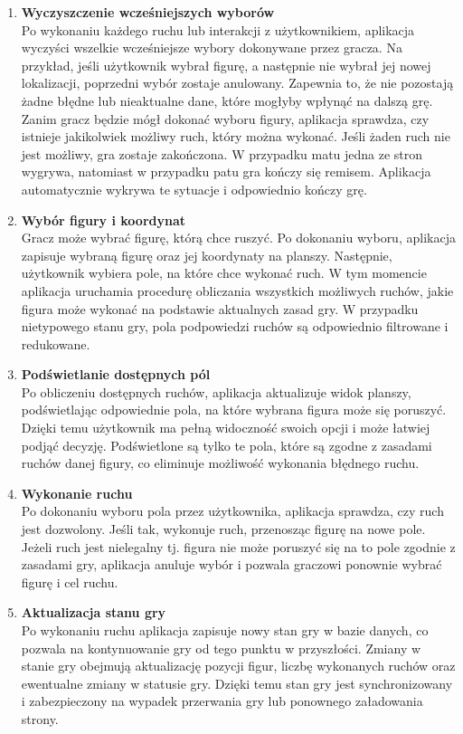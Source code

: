 \documentclass[12pt,a4paper]{article}
\begin{document}
\begin{enumerate}
    \item \textbf{Wyczyszczenie wcześniejszych wyborów}\\
    Po wykonaniu każdego ruchu lub interakcji z użytkownikiem, aplikacja wyczyści wszelkie wcześniejsze wybory dokonywane przez gracza. Na przykład, jeśli użytkownik wybrał figurę, a następnie nie wybrał jej nowej lokalizacji, poprzedni wybór zostaje anulowany. Zapewnia to, że nie pozostają żadne błędne lub nieaktualne dane, które mogłyby wpłynąć na dalszą grę. Zanim gracz będzie mógł dokonać wyboru figury, aplikacja sprawdza, czy istnieje jakikolwiek możliwy ruch, który można wykonać. Jeśli żaden ruch nie jest możliwy, gra zostaje zakończona. W przypadku matu jedna ze stron wygrywa, natomiast w przypadku patu gra kończy się remisem. Aplikacja automatycznie wykrywa te sytuacje i odpowiednio kończy grę.

    \item \textbf{Wybór figury i koordynat}\\
    Gracz może wybrać figurę, którą chce ruszyć. Po dokonaniu wyboru, aplikacja zapisuje wybraną figurę oraz jej koordynaty na planszy. Następnie, użytkownik wybiera pole, na które chce wykonać ruch. W tym momencie aplikacja uruchamia procedurę obliczania wszystkich możliwych ruchów, jakie figura może wykonać na podstawie aktualnych zasad gry. W przypadku nietypowego stanu gry,  pola podpowiedzi ruchów są odpowiednio filtrowane i redukowane.

    \item \textbf{Podświetlanie dostępnych pól}\\
    Po obliczeniu dostępnych ruchów, aplikacja aktualizuje widok planszy, podświetlając odpowiednie pola, na które wybrana figura może się poruszyć. Dzięki temu użytkownik ma pełną widoczność swoich opcji i może łatwiej podjąć decyzję. Podświetlone są tylko te pola, które są zgodne z zasadami ruchów danej figury, co eliminuje możliwość wykonania błędnego ruchu.

    \item \textbf{Wykonanie ruchu}\\
    Po dokonaniu wyboru pola przez użytkownika, aplikacja sprawdza, czy ruch jest dozwolony. Jeśli tak, wykonuje ruch, przenosząc figurę na nowe pole. Jeżeli ruch jest nielegalny tj. figura nie może poruszyć się na to pole zgodnie z zasadami gry, aplikacja anuluje wybór i pozwala graczowi ponownie wybrać figurę i cel ruchu.

    \item \textbf{Aktualizacja stanu gry}\\
    Po wykonaniu ruchu aplikacja zapisuje nowy stan gry w bazie danych, co pozwala na kontynuowanie gry od tego punktu w przyszłości. Zmiany w stanie gry obejmują aktualizację pozycji figur, liczbę wykonanych ruchów oraz ewentualne zmiany w statusie gry. Dzięki temu stan gry jest synchronizowany i zabezpieczony na wypadek przerwania gry lub ponownego załadowania strony.


\end{enumerate}
\end{document}
